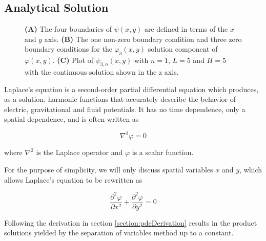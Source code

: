 \subsection{Analytical Solution}\label{analyticalSolution}

\begin{figure}[ht]
\centering{}
\caption{\textbf{(A)} The four boundaries of $\psi \left(x,y \right)$ are defined in terms of the $x$ and $y$ axis. \textbf{(B)} The one non-zero boundary condition and three zero boundary conditions for the $\varphi_3\left(x,y\right)$ solution component of $\varphi \left(x,y \right)$. \textbf{(C)} Plot of $\psi_{3,n}\left(x,y\right)$ with $n=1$, $L=5$ and $H=5$ with the continuous solution shown in the z axis.}
\label{fig:pdeBoundary}
\end{figure}

Laplace's equation is a second-order partial differential equation which produces, as a solution, harmonic functions that accurately describe the behavior of electric, gravitational and fluid potentials.  It has no time dependence, only a spatial dependence, and is often written as  

\begin{equation}\label{}
\nabla^2 \varphi = 0
\end{equation}

where \(\nabla^2\) is the Laplace operator and \(\varphi\) is a scalar function.

For the purpose of simplicity, we will only discuss spatial variables $x$ and $y$, which allows Laplace's equation to be rewritten as

\begin{equation}\label{eq:Laplace2D}
\frac{\partial^2 \varphi}{\partial x^2} + \frac{\partial^2 \varphi}{\partial y^2} = 0
\end{equation}

Following the derivation in section \ref{section:pdeDerivation} \cite{vrscay2010amath} results in the product solutions yielded by the separation of variables method up to a constant.

